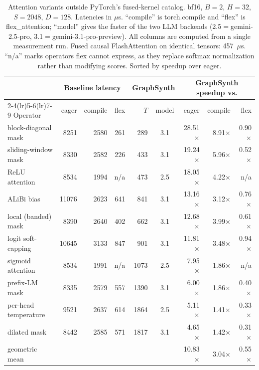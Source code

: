 \documentclass[10pt,twocolumn]{article}
\newcommand{\tc}{torch.compile}
\newcommand{\fx}{flex\_attention}
\begin{document}
\begin{table}[t]
\centering
\caption{Attention variants outside PyTorch's fused-kernel catalog. bf16, $B{=}2$,
$H{=}32$, $S{=}2048$, $D{=}128$. Latencies in $\mu$s. ``compile'' is \tc{} and ``flex''
is \fx{}; ``model'' gives the faster of the two LLM backends (2.5${=}$gemini-2.5-pro,
3.1${=}$gemini-3.1-pro-preview). All columns are computed from a single measurement run. Fused causal
FlashAttention on identical tensors: 457~$\mu$s. ``n/a'' marks operators flex cannot express, as they replace softmax
normalization rather than modifying scores. Sorted by speedup over eager.}
\label{tab:attn}
\setlength{\tabcolsep}{3pt}
\begin{tabular}{lrrrrcrrr}
\toprule
& \multicolumn{3}{c}{Baseline latency} & \multicolumn{2}{c}{GraphSynth}
& \multicolumn{3}{c}{GraphSynth speedup vs.} \\
\cmidrule(lr){2-4}\cmidrule(lr){5-6}\cmidrule(lr){7-9}
Operator & eager & compile & flex & $T$ & model & eager & compile & flex \\
\midrule
block-diagonal mask   &  8251 & 2580 & 261 &  289 & 3.1 & 28.51$\times$ & 8.91$\times$ & 0.90$\times$ \\
sliding-window mask   &  8330 & 2582 & 226 &  433 & 3.1 & 19.24$\times$ & 5.96$\times$ & 0.52$\times$ \\
ReLU attention        &  8534 & 1994 & n/a &  473 & 2.5 & 18.05$\times$ & 4.22$\times$ & n/a          \\
ALiBi bias            & 11076 & 2623 & 641 &  841 & 3.1 & 13.16$\times$ & 3.12$\times$ & 0.76$\times$ \\
local (banded) mask   &  8390 & 2640 & 402 &  662 & 3.1 & 12.68$\times$ & 3.99$\times$ & 0.61$\times$ \\
logit soft-capping    & 10645 & 3133 & 847 &  901 & 3.1 & 11.81$\times$ & 3.48$\times$ & 0.94$\times$ \\
sigmoid attention     &  8534 & 1991 & n/a & 1073 & 2.5 &  7.95$\times$ & 1.86$\times$ & n/a          \\
prefix-LM mask        &  8335 & 2579 & 557 & 1390 & 3.1 &  6.00$\times$ & 1.86$\times$ & 0.40$\times$ \\
per-head temperature  &  9521 & 2637 & 614 & 1864 & 2.5 &  5.11$\times$ & 1.41$\times$ & 0.33$\times$ \\
dilated mask          &  8442 & 2585 & 571 & 1817 & 3.1 &  4.65$\times$ & 1.42$\times$ & 0.31$\times$ \\
\midrule
geometric mean & & & & & & 10.83$\times$ & 3.04$\times$ & 0.55$\times$ \\
\bottomrule
\end{tabular}
\end{table}
\end{document}

